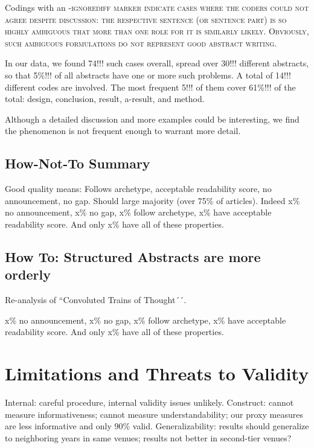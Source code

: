\documentclass[10pt,journal,compsoc]{IEEEtran}
\newcommand{\Cb}[1]{\bgroup\scshape #1\egroup}  %
\begin{document}
Codings with an \Cb{-ignorediff} marker indicate cases where the coders could not agree
despite discussion: the respective sentence (or sentence part) is so highly ambiguous that
more than one role for it is similarly likely.
Obviously, such ambiguous formulations do not represent good abstract writing.

In our data, we found 74!!! such cases overall, spread over 30!!! different abstracts,
so that 5\%!!! of all abstracts have one or more such problems.
A total of 14!!! different codes are involved.
The most frequent 5!!! of them cover 61\%!!! of the total:
design, conclusion, result, a-result, and method.

Although a detailed discussion and more examples could be interesting, 
we find the phenomenon is not frequent enough to warrant more detail.


\subsection{How-Not-To Summary}

Good quality means: Follows archetype, acceptable readability score, no announcement, no gap.
Should large majority (over 75\% of articles).
Indeed x\% no announcement, x\% no gap, x\% follow archetype, x\% have acceptable readability score.
And only x\% have all of these properties.


\subsection{How To: Structured Abstracts are more orderly}

Re-analysis of ``Convoluted Trains of Thought´´. 

x\% no announcement, x\% no gap, x\% follow archetype, x\% have acceptable readability score.
And only x\% have all of these properties.




\section{Limitations and Threats to Validity}

\noindent
Internal: careful procedure, internal validity issues unlikely.
Construct: cannot measure informativeness; cannot measure understandability;
our proxy measures are less informative and only 90\% valid.
Generalizability: 
results should generalize to neighboring years in same venues;
results not better in second-tier venues?
\end{document}
